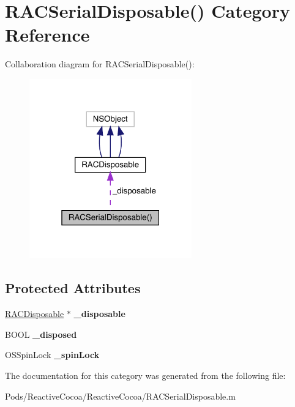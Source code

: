 \hypertarget{category_r_a_c_serial_disposable_07_08}{}\section{R\+A\+C\+Serial\+Disposable() Category Reference}
\label{category_r_a_c_serial_disposable_07_08}


Collaboration diagram for R\+A\+C\+Serial\+Disposable()\+:\nopagebreak
\begin{figure}[H]
\begin{center}
\leavevmode
\includegraphics[width=199pt]{category_r_a_c_serial_disposable_07_08__coll__graph}
\end{center}
\end{figure}
\subsection*{Protected Attributes}
\begin{DoxyCompactItemize}
\item 
\mbox{\label{category_r_a_c_serial_disposable_07_08_a0cdb7c3f5f1920d9d6a4a876c1d254b8}} 
\mbox{\hyperlink{interface_r_a_c_disposable}{R\+A\+C\+Disposable}} $\ast$ {\bfseries \+\_\+disposable}
\item 
\mbox{\label{category_r_a_c_serial_disposable_07_08_a0deebbe3dbefb2ebd7b4b30da494724f}} 
B\+O\+OL {\bfseries \+\_\+disposed}
\item 
\mbox{\label{category_r_a_c_serial_disposable_07_08_a54839b23f25c0e80cceb77d0d7e3cff8}} 
O\+S\+Spin\+Lock {\bfseries \+\_\+spin\+Lock}
\end{DoxyCompactItemize}


The documentation for this category was generated from the following file\+:\begin{DoxyCompactItemize}
\item 
Pods/\+Reactive\+Cocoa/\+Reactive\+Cocoa/R\+A\+C\+Serial\+Disposable.\+m\end{DoxyCompactItemize}
